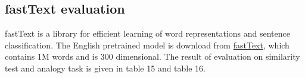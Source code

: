 \documentclass[a4paper, 11pt]{article}
\begin{document}
\subsection{fastText evaluation}
fastText is a library for efficient learning of word representations and sentence classification. The English pretrained model is download from \href{https://fasttext.cc/docs/en/english-vectors.html}{fastText}, which contains 1M words and is 300 dimensional.  The result of evaluation on similarity test and analogy task is given in table 15 and table 16.
\begin{table}[ht!]
\centering
{}
\caption{Similarity result of FastText}
\label{tab:my-table}
\end{table}
\begin{table}[ht!]
\centering
{}
\caption{Analogy tasks on FastText }
\label{tab:my-table}
\end{table}
\end{document}
